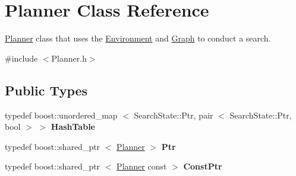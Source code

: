\hypertarget{class_planner}{\section{\-Planner \-Class \-Reference}
\label{class_planner}
}


\hyperlink{class_planner}{\-Planner} class that uses the \hyperlink{class_environment}{\-Environment} and \hyperlink{class_graph}{\-Graph} to conduct a search.  




{\ttfamily \#include $<$\-Planner.\-h$>$}

\subsection*{\-Public \-Types}
\begin{DoxyCompactItemize}
\item 
\hypertarget{class_planner_adf0808cafd0a2fc6e8d268eabf00386e}{typedef boost\-::unordered\-\_\-map\*
$<$ \-Search\-State\-::\-Ptr, pair\*
$<$ \-Search\-State\-::\-Ptr, bool $>$ $>$ {\bfseries \-Hash\-Table}}\label{class_planner_adf0808cafd0a2fc6e8d268eabf00386e}

\item 
\hypertarget{class_planner_a94cb7df7e883a1efac1a21daa52a96f5}{typedef boost\-::shared\-\_\-ptr\*
$<$ \hyperlink{class_planner}{\-Planner} $>$ {\bfseries \-Ptr}}\label{class_planner_a94cb7df7e883a1efac1a21daa52a96f5}

\item 
\hypertarget{class_planner_a9a21451487b9d05b36d3931bfae80d74}{typedef boost\-::shared\-\_\-ptr\*
$<$ \hyperlink{class_planner}{\-Planner} const  $>$ {\bfseries \-Const\-Ptr}}\label{class_planner_a9a21451487b9d05b36d3931bfae80d74}

\end{DoxyCompactItemize}

